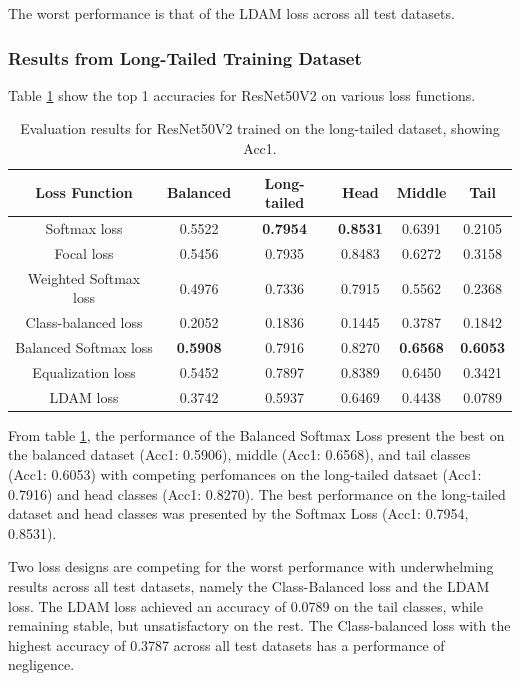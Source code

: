 The worst performance is that of the LDAM loss across all test datasets.

\subsubsection{Results from Long-Tailed Training Dataset}

Table \ref{tab:resnet_lt_acc1_1} show the top 1 accuracies for ResNet50V2 on various loss functions.

\begin{table}[H]
    \centering
    \caption{Evaluation results for ResNet50V2 trained on the long-tailed dataset, showing Acc1.}
    \begin{tabular}{cccccc}
        \toprule
        Loss Function & Balanced & Long-tailed & Head & Middle & Tail \\ 
        \midrule
        Softmax loss   & 0.5522 & \textbf{0.7954} & \textbf{0.8531} & 0.6391 & 0.2105 \\
        Focal loss   & 0.5456 & 0.7935 & 0.8483 & 0.6272 & 0.3158 \\
        Weighted Softmax loss   & 0.4976 & 0.7336 & 0.7915 & 0.5562 & 0.2368 \\
        Class-balanced loss   & 0.2052 & 0.1836 &  0.1445 & 0.3787 & 0.1842 \\
        Balanced Softmax loss   & \textbf{0.5908} & 0.7916 & 0.8270 & \textbf{0.6568} & \textbf{0.6053} \\
        Equalization loss   & 0.5452 & 0.7897 & 0.8389 & 0.6450 & 0.3421 \\
        LDAM loss   & 0.3742 & 0.5937 & 0.6469 & 0.4438 & 0.0789 \\
        \bottomrule
    \end{tabular}
    \label{tab:resnet_lt_acc1_1}
\end{table}


From table \ref{tab:resnet_lt_acc1_1}, the performance of the Balanced Softmax Loss present the best on the balanced dataset (Acc1: 0.5906), middle (Acc1: 0.6568), and tail classes (Acc1: 0.6053) with competing perfomances on the long-tailed datsaet (Acc1: 0.7916) and head classes (Acc1: 0.8270). The best performance on the long-tailed dataset and head classes was presented by the Softmax Loss (Acc1: 0.7954, 0.8531).

Two loss designs are competing for the worst performance with underwhelming results across all test datasets, namely the Class-Balanced loss and the LDAM loss. The LDAM loss achieved an accuracy of 0.0789 on the tail classes, while remaining stable, but unsatisfactory on the rest. The Class-balanced loss with the highest accuracy of 0.3787 across all test datasets has a performance of negligence.

